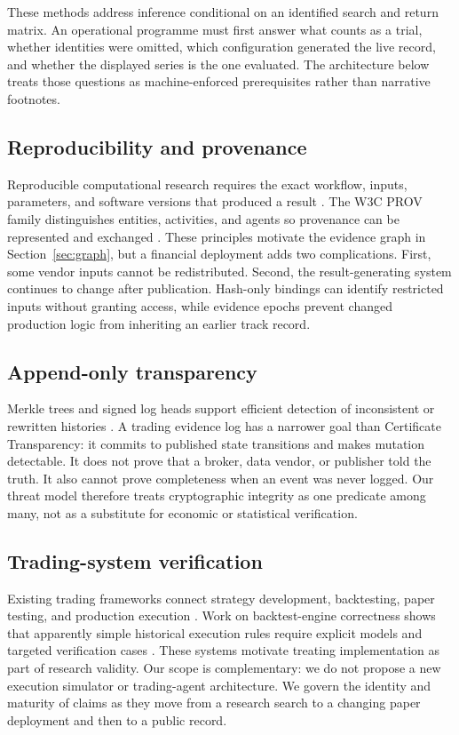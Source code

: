 \documentclass[11pt]{article}
\begin{document}
These methods address inference conditional on an identified search and return matrix. An operational programme must first answer what counts as a trial, whether identities were omitted, which configuration generated the live record, and whether the displayed series is the one evaluated. The architecture below treats those questions as machine-enforced prerequisites rather than narrative footnotes.

\subsection{Reproducibility and provenance}

Reproducible computational research requires the exact workflow, inputs, parameters, and software versions that produced a result \cite{sandve2013ten}. The W3C PROV family distinguishes entities, activities, and agents so provenance can be represented and exchanged \cite{w3c2013prov}. These principles motivate the evidence graph in Section~\ref{sec:graph}, but a financial deployment adds two complications. First, some vendor inputs cannot be redistributed. Second, the result-generating system continues to change after publication. Hash-only bindings can identify restricted inputs without granting access, while evidence epochs prevent changed production logic from inheriting an earlier track record.

\subsection{Append-only transparency}

Merkle trees and signed log heads support efficient detection of inconsistent or rewritten histories \cite{merkle1988digital,laurie2021ct}. A trading evidence log has a narrower goal than Certificate Transparency: it commits to published state transitions and makes mutation detectable. It does not prove that a broker, data vendor, or publisher told the truth. It also cannot prove completeness when an event was never logged. Our threat model therefore treats cryptographic integrity as one predicate among many, not as a substitute for economic or statistical verification.

\subsection{Trading-system verification}

Existing trading frameworks connect strategy development, backtesting, paper testing, and production execution \cite{decastro2021mt5se}. Work on backtest-engine correctness shows that apparently simple historical execution rules require explicit models and targeted verification cases \cite{low2015correctness}. These systems motivate treating implementation as part of research validity. Our scope is complementary: we do not propose a new execution simulator or trading-agent architecture. We govern the identity and maturity of claims as they move from a research search to a changing paper deployment and then to a public record.
\end{document}

